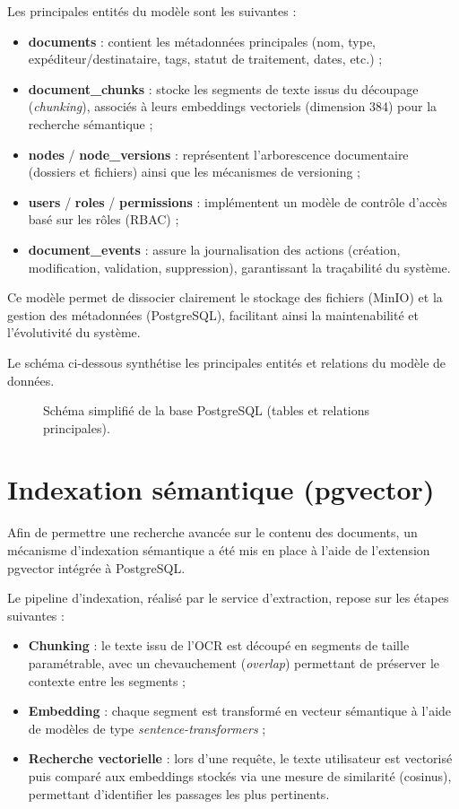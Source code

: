 \documentclass[12pt,a4paper]{report}
\begin{document}
Les principales entités du modèle sont les suivantes :
\begin{itemize}
  \item \textbf{documents} : contient les métadonnées principales (nom, type, expéditeur/destinataire, tags, statut de traitement, dates, etc.) ;
  \item \textbf{document\_chunks} : stocke les segments de texte issus du découpage (\textit{chunking}), associés à leurs embeddings vectoriels (dimension 384) pour la recherche sémantique ;
  \item \textbf{nodes} / \textbf{node\_versions} : représentent l’arborescence documentaire (dossiers et fichiers) ainsi que les mécanismes de versioning ;
  \item \textbf{users} / \textbf{roles} / \textbf{permissions} : implémentent un modèle de contrôle d’accès basé sur les rôles (RBAC) ;
  \item \textbf{document\_events} : assure la journalisation des actions (création, modification, validation, suppression), garantissant la traçabilité du système.
\end{itemize}

Ce modèle permet de dissocier clairement le stockage des fichiers (MinIO) et la gestion des métadonnées (PostgreSQL), facilitant ainsi la maintenabilité et l’évolutivité du système.

Le schéma ci-dessous synthétise les principales entités et relations du modèle de données.
\begin{figure}[h!]
\centering

\caption{Schéma simplifié de la base PostgreSQL (tables et relations principales).}
\label{fig:db-schema-postgres}
\end{figure}

\section{Indexation sémantique (pgvector)}
Afin de permettre une recherche avancée sur le contenu des documents, un mécanisme d’indexation sémantique a été mis en place à l’aide de l’extension pgvector intégrée à PostgreSQL.

Le pipeline d’indexation, réalisé par le service d’extraction, repose sur les étapes suivantes :
\begin{itemize}
  \item \textbf{Chunking} : le texte issu de l’OCR est découpé en segments de taille paramétrable, avec un chevauchement (\textit{overlap}) permettant de préserver le contexte entre les segments ;
  \item \textbf{Embedding} : chaque segment est transformé en vecteur sémantique à l’aide de modèles de type \textit{sentence-transformers} ;
  \item \textbf{Recherche vectorielle} : lors d’une requête, le texte utilisateur est vectorisé puis comparé aux embeddings stockés via une mesure de similarité (cosinus), permettant d’identifier les passages les plus pertinents.
\end{itemize}
\end{document}
